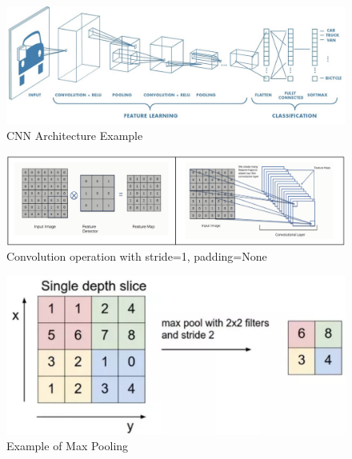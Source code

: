 \documentclass[12pt]{article}
\begin{document}
\begin{figure}[h!]
  \begin{center}
    \includegraphics[scale=0.5]{fig5}
    \end{center}
  \caption{CNN Architecture Example}
  \label{fig:CNN}
\end{figure}

\begin{figure}[h!]
  \begin{center}
    \includegraphics[scale=0.5]{fig6}
    \end{center}
  \caption{Convolution operation with stride=1, padding=None}
  \label{fig:CNNStridePad}
\end{figure}

\begin{figure}[h!]
  \begin{center}
    \includegraphics[scale=0.5]{fig7}
  \end{center}
  \caption{Example of Max Pooling}
  \label{fig:CNNPooling}
  \end{figure}
\end{document}
